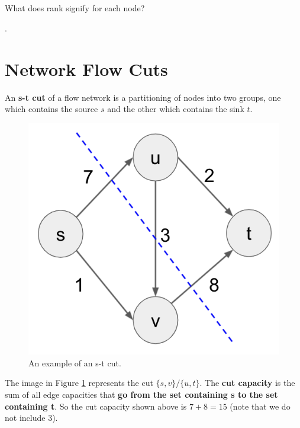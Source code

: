 \documentclass [12pt]{article}
\begin{document}
\subsection{}
What does rank signify for each node?

.


\pagebreak
\section{Network Flow Cuts }

An \textbf{s-t cut} of a flow network is a partitioning of nodes into two groups, one which contains the source $s$ and the other which contains the sink $t$. 

\begin{figure}[h!]
\centering
\includegraphics[scale=0.5]{cut-example.png}
\caption{An example of an s-t cut.}
\label{fig:cut_example}
\end{figure}


The image in Figure \ref{fig:cut_example} represents the cut $\{s, v\} / \{u, t\}$. The \textbf{cut capacity} is the sum of all edge capacities that \textbf{go from the set containing s to the set containing t}. So the cut capacity shown above is $7 + 8 = 15$ (note that we do not include $3$).

\subsection{}
\end{document}
